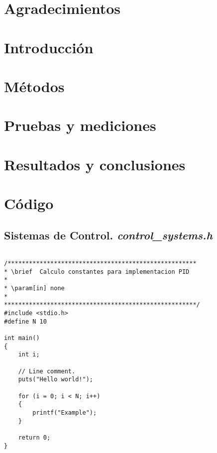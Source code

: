 \documentclass[a4paper,openright,12pt]{book}
\begin{document}
\chapter*{Agradecimientos}
\thispagestyle{empty}
\blindtext

\tableofcontents{\thispagestyle{empty}}

\listoffigures{\thispagestyle{empty}}

\listoftables{\thispagestyle{empty}}


\chapter{Introducción}
\setcounter{page}{1 }
\blindtext

\chapter{Métodos}
\blindtext

\chapter{Pruebas y mediciones}
\blindtext

\chapter{Resultados y conclusiones}
\blindtext

\appendix
\chapter{Código}
\section{Sistemas de Control. \textit{control\_systems.h}}
\begin{lstlisting}[frame=single]

/*****************************************************
* \brief  Calculo constantes para implementacion PID
*
* \param[in] none
*
******************************************************/
#include <stdio.h>
#define N 10

int main()
{
    int i;

    // Line comment.
    puts("Hello world!");
    
    for (i = 0; i < N; i++)
    {
        printf("Example");
    }

    return 0;
}
\end{lstlisting}
\end{document}
